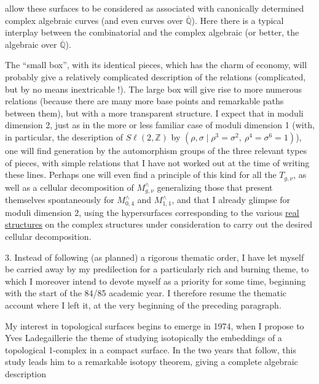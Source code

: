 
allow these surfaces to be considered as associated with
canonically determined complex algebraic curves (and even curves over $\overline{\mathbb{Q}}$).
Here there is a typical interplay between the combinatorial
and the complex algebraic (or better, the algebraic over $\overline{\mathbb{Q}}$).

The ``small box'', with its identical pieces, which has
the charm of economy, will probably give a relatively
complicated description of the relations (complicated, but by no means
inextricable !). The large box will give rise to more numerous
relations (because there are many more base points and
remarkable paths between them), but with a more transparent structure. I
expect that in moduli dimension 2, just as in the more or
less familiar case of moduli dimension 1 (with, in particular, the
description of $S\ell(2,\mathbb{Z})$ by $(\rho,\sigma \mid \rho^3 = \sigma^2,\ \rho^4 = \sigma^6 = 1)$), one will find
generation by the automorphism groups of the three relevant types
of pieces, with simple relations that I have not worked out
at the time of writing these lines. Perhaps one will even find a
principle of this kind for all the $T_{g,\nu}$, as well as a cellular
decomposition of $M^{\wedge}_{g,\nu}$ generalizing those that present themselves spontaneously
for $M^{\wedge}_{0,4}$ and $M^{\wedge}_{1,1}$, and that I already glimpse for
moduli dimension 2, using the hypersurfaces corresponding
to the various \uline{real structures} on the complex structures
under consideration to carry out the desired cellular decomposition.


3. Instead of following (as planned) a rigorous thematic
order, I have let myself be carried away by my predilection for a
particularly rich and burning theme, to which I moreover intend to
devote myself as a priority for some time, beginning with the start
of the 84/85 academic year. I therefore resume the thematic account where I left it,
at the very beginning of the preceding paragraph.

My interest in topological surfaces begins to emerge
in 1974, when I propose to Yves Ladegaillerie the theme of studying
isotopically the embeddings of a topological 1-complex in a compact
surface. In the two years that follow, this study leads him to
a remarkable isotopy theorem, giving a complete algebraic description


